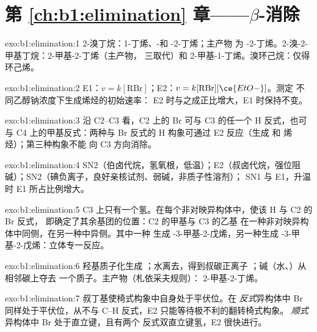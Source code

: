\section*{第 \ref{ch:b1:elimination} 章——\texorpdfstring{$\beta$}{贝塔}-消除}

\begin{solution}{exo:b1:elimination:1}
2-溴丁烷：1-丁烯、-和 -2-丁烯；主产物
为 -2-丁烯。2-溴-2-甲基丁烷：2-甲基-2-丁烯（主产物，
三取代）和 2-甲基-1-丁烯。溴环己烷：仅得环己烯。
\end{solution}

\begin{solution}{exo:b1:elimination:2}
E1：$v = k[\mathrm{RBr}]$；E2：$v = k[\mathrm{RBr}][\ce{EtO-}]$。测定
不同乙醇钠浓度下生成烯烃的初始速率：
E2 时与之成正比增大，E1 时保持不变。
\end{solution}

\begin{solution}{exo:b1:elimination:3}
沿 C2--C3 看，C2 上的 Br 可与 C3 的任一个 H 反式，也可与
C4 上的甲基反式：两种与 Br 反式的 H 构象可通过 E2
反应（生成  和  烯烃）；第三种构象不能
向 C3 方向消除。
\end{solution}

\begin{solution}{exo:b1:elimination:4}
SN2（伯卤代烷，氢氧根，低温）；E2（叔卤代烷，强位阻
碱）；SN2（碘负离子，良好亲核试剂、弱碱，非质子性溶剂）；
SN1 与 E1，升温时 E1 所占比例增大。
\end{solution}

\begin{solution}{exo:b1:elimination:5}
C3 上只有一个氢。在每个非对映异构体中，使该 H 与 C2 的 Br 反式，
即确定了其余基团的位置：C2 的甲基与 C3 的乙基
在一种非对映异构体中同侧，在另一种中异侧。其中一种
生成 -3-甲基-2-戊烯，另一种生成
-3-甲基-2-戊烯：立体专一反应。
\end{solution}

\begin{solution}{exo:b1:elimination:6}
羟基质子化生成 ；水离去，得到叔碳正离子
；碱（水、）从相邻碳上夺去
一个质子。主产物（札依采夫规则）：
2-甲基-2-丁烯。
\end{solution}

\begin{solution}{exo:b1:elimination:7}
叔丁基使椅式构象中自身处于平伏位。在
\textit{反式}异构体中 Br 同样处于平伏位，从不与
C--H 反式，E2 只能等待极不利的翻转椅式构象。
\textit{顺式}异构体中 Br 处于直立键，且有两个
反式双直立键氢，E2 很快进行。
\end{solution}

